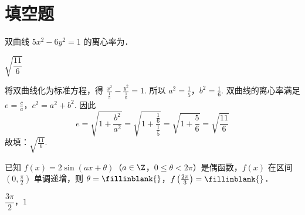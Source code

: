 \documentclass[UTF8,a4paper,oneside,11pt]{ctexbook}
\begin{document}
\section{填空题}

\begin{problem}
双曲线 \(5x^2-6y^2=1\) 的离心率为\fillinblank{}．
\end{problem}

\begin{answer}
\(\sqrt{\dfrac{11}{6}}\)
\end{answer}

\begin{solution}
将双曲线化为标准方程，得 \(\frac{x^2}{\frac{1}{5}}-\frac{y^2}{\frac{1}{6}}=1\). 所以 \(a^2=\frac{1}{5}\)，\(b^2=\frac{1}{6}\). 双曲线的离心率满足 \(e=\frac{c}{a}\)，\(c^2=a^2+b^2\). 因此
\[
e=\sqrt{1+\frac{b^2}{a^2}}=\sqrt{1+\frac{\frac{1}{6}}{\frac{1}{5}}}=\sqrt{1+\frac{5}{6}}=\sqrt{\frac{11}{6}}
\]
故填：\(\sqrt{\frac{11}{6}}\).
\end{solution}

\begin{problem}
已知 \(f(x)=2\sin(ax+\theta)\)（\(a\in\Z\)，\(0\le \theta<2\pi\)）是偶函数，\(f(x)\) 在区间 \(\left( 0,\frac{\pi}{2} \right)\) 单调递增，则 \(\theta=\fillinblank{}\)，\(f\left( \frac{2\pi}{3} \right)=\fillinblank{}\)．
\end{problem}

\begin{answer}
\(\dfrac{3\pi}{2}\)，\(1\)
\end{answer}
\end{document}
